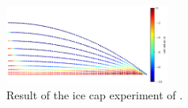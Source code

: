 \documentclass[10pt,twocolumn]{article}
\begin{document}
\begin{figure}[!h]
\begin{center} 
\includegraphics[width=0.48\textwidth]{fig/hewitt2017.png}   
\end{center}
\caption{ Result of the ice cap experiment  of \citep{hewitt2017models}. \label{hewitt2017}}
\end{figure}




\end{document}
